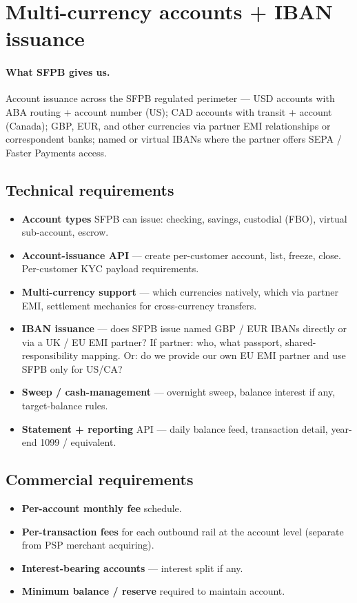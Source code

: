 \documentclass[11pt,letterpaper]{article}
\begin{document}
\section{Multi-currency accounts + IBAN issuance}

\paragraph{What SFPB gives us.}
Account issuance across the SFPB regulated perimeter --- USD accounts
with ABA routing + account number (US); CAD accounts with transit +
account (Canada); GBP, EUR, and other currencies via partner EMI
relationships or correspondent banks; named or virtual IBANs where
the partner offers SEPA / Faster Payments access.

\subsection{Technical requirements}
\begin{itemize}[leftmargin=1.6em]
  \item \textbf{Account types} SFPB can issue: checking, savings,
        custodial (FBO), virtual sub-account, escrow.
  \item \textbf{Account-issuance API} --- create per-customer account,
        list, freeze, close. Per-customer KYC payload requirements.
  \item \textbf{Multi-currency support} --- which currencies natively,
        which via partner EMI, settlement mechanics for cross-currency
        transfers.
  \item \textbf{IBAN issuance} --- does SFPB issue named GBP / EUR
        IBANs directly or via a UK / EU EMI partner? If partner: who,
        what passport, shared-responsibility mapping. Or: do we
        provide our own EU EMI partner and use SFPB only for US/CA?
  \item \textbf{Sweep / cash-management} --- overnight sweep, balance
        interest if any, target-balance rules.
  \item \textbf{Statement + reporting} API --- daily balance feed,
        transaction detail, year-end 1099 / equivalent.
\end{itemize}

\subsection{Commercial requirements}
\begin{itemize}[leftmargin=1.6em]
  \item \textbf{Per-account monthly fee} schedule.
  \item \textbf{Per-transaction fees} for each outbound rail at the
        account level (separate from PSP merchant acquiring).
  \item \textbf{Interest-bearing accounts} --- interest split if any.
  \item \textbf{Minimum balance / reserve} required to maintain
        account.
\end{itemize}
\end{document}

